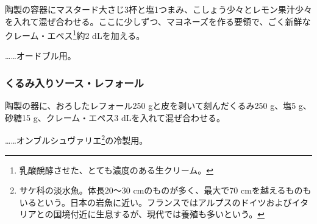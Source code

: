 \begin{recette}
陶製の容器にマスタード大さじ3杯と塩1つまみ、こしょう少々とレモン果汁少々を入れて混ぜ合わせる。ここに少しずつ、マヨネーズを作る要領で、ごく新鮮なクレーム・エペス\footnote{乳酸醗酵させた、とても濃度のある生クリーム。}約2
dLを加える。

\ldots{}\ldots{}オードブル用。

\atoaki{}

\hypertarget{sauce-raifort-aux-noix}{%
\subsubsection{くるみ入りソース・レフォール}\label{sauce-raifort-aux-noix}}



陶製の器に、おろしたレフォール250 gと皮を剥いて刻んだくるみ250 g、塩5
g、砂糖15 g、クレーム・エペス3 dLを入れて混ぜ合わせる。

\ldots{}\ldots{}オンブルシュヴァリエ\footnote{サケ科の淡水魚。体長20〜30
  cmのものが多く、最大で70
  cmを越えるものもいるという。日本の岩魚に近い。フランスではアルプスのドイツおよびイタリアとの国境付近に生息するが、現代では養殖も多いという。}の冷製用。

\atoaki{}

\hypertarget{sauce-ravigote-froide}{%
}
\end{recette}
